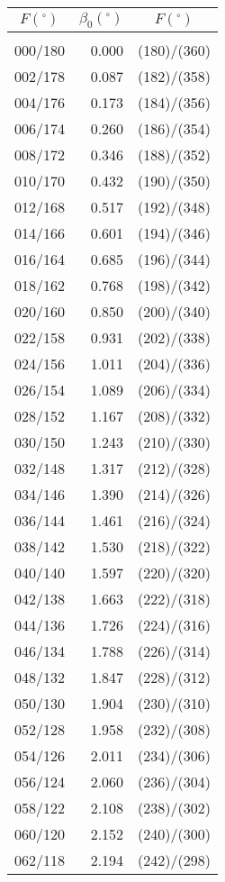 \newpage
\begin{table}\centering
\small{ \begin{tabular}{crc}
$F (^\circ)$ & $\beta_0(^\circ)$ &
$F (^\circ)$ \\\hline
&&\\[-1.75ex]
000/180 &  0.000 & (180)/(360)\\
002/178 &  0.087 & (182)/(358)\\
004/176 &  0.173 & (184)/(356)\\
006/174 &  0.260 & (186)/(354)\\
008/172 &  0.346 & (188)/(352)\\
010/170 &  0.432 & (190)/(350)\\
012/168 &  0.517 & (192)/(348)\\
014/166 &  0.601 & (194)/(346)\\
016/164 &  0.685 & (196)/(344)\\
018/162 &  0.768 & (198)/(342)\\
020/160 &  0.850 & (200)/(340)\\
022/158 &  0.931 & (202)/(338)\\
024/156 &  1.011 & (204)/(336)\\
026/154 &  1.089 & (206)/(334)\\
028/152 &  1.167 & (208)/(332)\\
030/150 &  1.243 & (210)/(330)\\
032/148 &  1.317 & (212)/(328)\\
034/146 &  1.390 & (214)/(326)\\
036/144 &  1.461 & (216)/(324)\\
038/142 &  1.530 & (218)/(322)\\
040/140 &  1.597 & (220)/(320)\\
042/138 &  1.663 & (222)/(318)\\
044/136 &  1.726 & (224)/(316)\\
046/134 &  1.788 & (226)/(314)\\
048/132 &  1.847 & (228)/(312)\\
050/130 &  1.904 & (230)/(310)\\
052/128 &  1.958 & (232)/(308)\\
054/126 &  2.011 & (234)/(306)\\
056/124 &  2.060 & (236)/(304)\\
058/122 &  2.108 & (238)/(302)\\
060/120 &  2.152 & (240)/(300)\\
062/118 &  2.194 & (242)/(298)\\

\end{tabular}}
\end{table}
